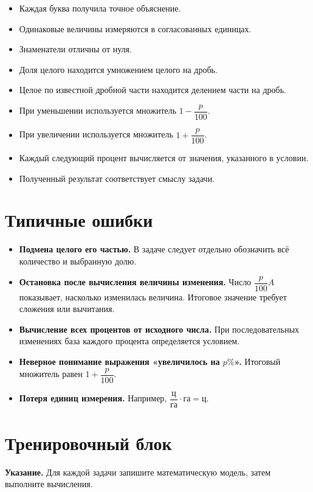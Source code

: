\documentclass[a4paper,12pt]{article}
\begin{document}
\begin{itemize}[label=\(\square\)]
  \item Каждая буква получила точное объяснение.
  \item Одинаковые величины измеряются в согласованных единицах.
  \item Знаменатели отличны от нуля.
  \item Доля целого находится умножением целого на дробь.
  \item Целое по известной дробной части находится делением части на дробь.
  \item При уменьшении используется множитель \(1-\dfrac{p}{100}\).
  \item При увеличении используется множитель \(1+\dfrac{p}{100}\).
  \item Каждый следующий процент вычисляется от значения, указанного в условии.
  \item Полученный результат соответствует смыслу задачи.
\end{itemize}

\section{Типичные ошибки}

\begin{itemize}
  \item \textbf{Подмена целого его частью.} В задаче следует отдельно обозначить всё количество и выбранную долю.
  \item \textbf{Остановка после вычисления величины изменения.} Число \(\dfrac{p}{100}A\) показывает, насколько изменилась величина. Итоговое значение требует сложения или вычитания.
  \item \textbf{Вычисление всех процентов от исходного числа.} При последовательных изменениях база каждого процента определяется условием.
  \item \textbf{Неверное понимание выражения «увеличилось на \(p\%\)».} Итоговый множитель равен \(1+\dfrac{p}{100}\).
  \item \textbf{Потеря единиц измерения.} Например, \(\dfrac{\text{ц}}{\text{га}}\cdot\text{га}=\text{ц}\).
\end{itemize}

\clearpage
\section*{Тренировочный блок}

\textbf{Указание.} Для каждой задачи запишите математическую модель, затем выполните вычисления.
\end{document}
